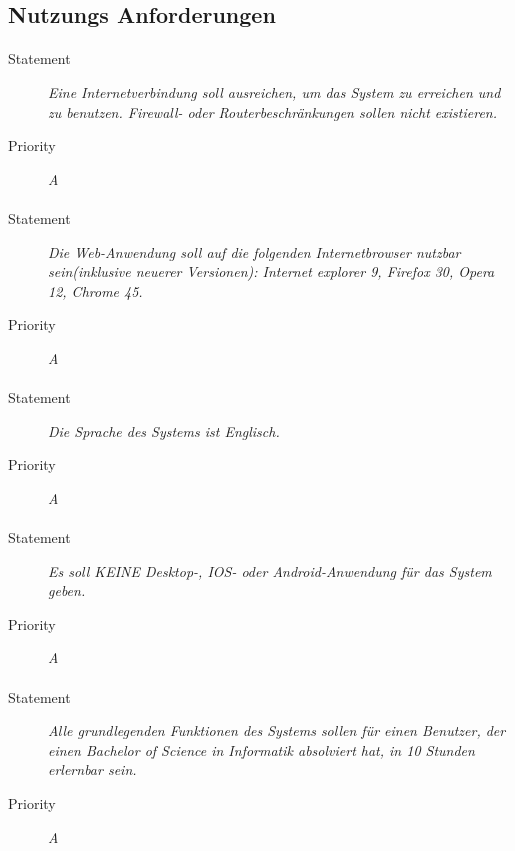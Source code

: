 \subsection{Nutzungs Anforderungen}


\paragraph{}
\begin{description}
\item[Statement] \textit{Eine Internetverbindung soll ausreichen, um das System zu erreichen und zu benutzen. Firewall- oder Routerbeschränkungen sollen nicht existieren.}
\item[Priority] \textit{A}
\end{description}

\paragraph{}
\begin{description}
\item[Statement] \textit{Die Web-Anwendung soll auf die folgenden Internetbrowser nutzbar sein(inklusive neuerer Versionen): Internet explorer 9, Firefox 30, Opera 12, Chrome 45.}
\item[Priority] \textit{A}
\end{description}

\paragraph{}
\begin{description}
\item[Statement] \textit{Die Sprache des Systems ist Englisch.}
\item[Priority] \textit{A}
\end{description}

\paragraph{}
\begin{description}
\item[Statement] \textit{Es soll KEINE Desktop-, IOS- oder Android-Anwendung für das System geben.}
\item[Priority] \textit{A}
\end{description}

\paragraph{}
\begin{description}
\item[Statement] \textit{Alle grundlegenden Funktionen des Systems sollen für einen Benutzer, der einen Bachelor of Science in Informatik absolviert hat, in 10 Stunden erlernbar sein.}
\item[Priority] \textit{A}
\end{description}

